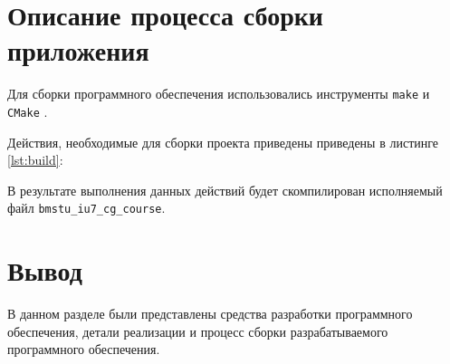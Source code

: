 \section{Описание процесса сборки приложения}

Для сборки программного обеспечения использовались инструменты \texttt{make} \cite{make} и \texttt{CMake} \cite{cmake}.

Действия, необходимые для сборки проекта приведены приведены в листинге \ref{lst:build}:


В результате выполнения данных действий будет скомпилирован исполняемый файл \texttt{bmstu\_iu7\_cg\_course}.

\section{Вывод}

В данном разделе были представлены средства разработки программного обеспечения, детали реализации и процесс сборки разрабатываемого программного обеспечения.